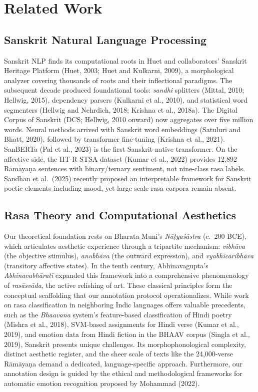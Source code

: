 \documentclass[11pt]{article}
\begin{document}
\section{Related Work}

\subsection{Sanskrit Natural Language Processing}

Sanskrit NLP finds its computational roots in Huet and collaborators' Sanskrit Heritage Platform (Huet, 2003; Huet and Kulkarni, 2009), a morphological analyzer covering thousands of roots and their inflectional paradigms. The subsequent decade produced foundational tools: \textit{sandhi} splitters (Mittal, 2010; Hellwig, 2015), dependency parsers (Kulkarni et al., 2010), and statistical word segmenters (Hellwig and Nehrdich, 2018; Krishna et al., 2018a). The Digital Corpus of Sanskrit (DCS; Hellwig, 2010 onward) now aggregates over five million words. Neural methods arrived with Sanskrit word embeddings (Satuluri and Bhatt, 2020), followed by transformer fine-tuning (Krishna et al., 2021). SanBERTa (Pal et al., 2023) is the first Sanskrit-native transformer. On the affective side, the IIT-R STSA dataset (Kumar et al., 2022) provides 12,892 R\=am\=aya\d na sentences with binary/ternary sentiment, not nine-class rasa labels. Sandhan et al.\ (2025) recently proposed an interpretable framework for Sanskrit poetic elements including mood, yet large-scale rasa corpora remain absent.

\subsection{Rasa Theory and Computational Aesthetics}

Our theoretical foundation rests on Bharata Muni's \textit{N\=a\d tyaś\=astra} (c.\ 200 BCE), which articulates aesthetic experience through a tripartite mechanism: \textit{vibh\=ava} (the objective stimulus), \textit{anubh\=ava} (the outward expression), and \textit{vyabhic\=aribh\=ava} (transitory affective states). In the tenth century, Abhinavagupta's \textit{Abhinavabh\=arat\=i} expanded this framework into a comprehensive phenomenology of \textit{ras\=asv\=ada}, the active relishing of art. These classical principles form the conceptual scaffolding that our annotation protocol operationalizes. While work on rasa classification in neighboring Indic languages offers valuable precedents, such as the \textit{Bhaavana} system's feature-based classification of Hindi poetry (Mishra et al., 2018), SVM-based assignments for Hindi verse (Kumar et al., 2019), and emotion data from Hindi fiction in the BHAAV corpus (Singla et al., 2019), Sanskrit presents unique challenges. Its morphophonological complexity, distinct aesthetic register, and the sheer scale of texts like the 24,000-verse R\=am\=aya\d na demand a dedicated, language-specific approach. Furthermore, our annotation design is guided by the ethical and methodological frameworks for automatic emotion recognition proposed by Mohammad (2022).
\end{document}
